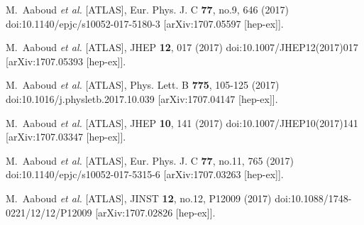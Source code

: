 \begin{thebibliography}{9}
M.~Aaboud \textit{et al.} [ATLAS],
Eur. Phys. J. C \textbf{77}, no.9, 646 (2017)
doi:10.1140/epjc/s10052-017-5180-3
[arXiv:1707.05597 [hep-ex]].

M.~Aaboud \textit{et al.} [ATLAS],
JHEP \textbf{12}, 017 (2017)
doi:10.1007/JHEP12(2017)017
[arXiv:1707.05393 [hep-ex]].

M.~Aaboud \textit{et al.} [ATLAS],
Phys. Lett. B \textbf{775}, 105-125 (2017)
doi:10.1016/j.physletb.2017.10.039
[arXiv:1707.04147 [hep-ex]].

M.~Aaboud \textit{et al.} [ATLAS],
JHEP \textbf{10}, 141 (2017)
doi:10.1007/JHEP10(2017)141
[arXiv:1707.03347 [hep-ex]].

M.~Aaboud \textit{et al.} [ATLAS],
Eur. Phys. J. C \textbf{77}, no.11, 765 (2017)
doi:10.1140/epjc/s10052-017-5315-6
[arXiv:1707.03263 [hep-ex]].

M.~Aaboud \textit{et al.} [ATLAS],
JINST \textbf{12}, no.12, P12009 (2017)
doi:10.1088/1748-0221/12/12/P12009
[arXiv:1707.02826 [hep-ex]].


\end{thebibliography}
